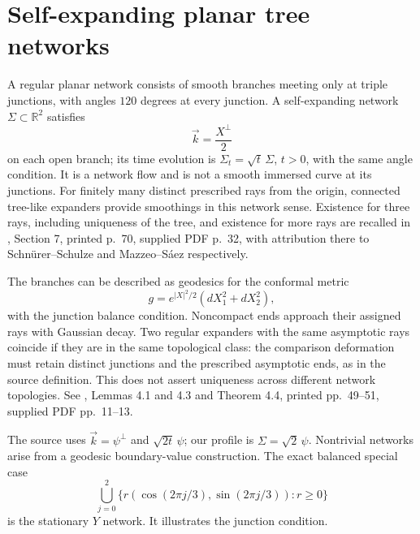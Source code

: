 \chapter{Self-expanding planar tree networks}\label{sec:catalogue-expanding-networks}
\begin{example}\label{ex:catalogue-expanding-networks}
A regular planar network consists of smooth branches meeting only at triple junctions, with angles $120$ degrees at every junction. A self-expanding network $\Sigma\subset\mathbb R^2$ satisfies
\[
 \vec k=\frac{X^\perp}{2}
\]
on each open branch; its time evolution is $\Sigma_t=\sqrt t\,\Sigma$, $t>0$, with the same angle condition. It is a network flow and is not a smooth immersed curve at its junctions. For finitely many distinct prescribed rays from the origin, connected tree-like expanders provide smoothings in this network sense. Existence for three rays, including uniqueness of the tree, and existence for more rays are recalled in \cite{CatINS19}, Section 7, printed p.~70, supplied PDF p.~32, with attribution there to Schn\"urer--Schulze and Mazzeo--S\'aez respectively.

The branches can be described as geodesics for the conformal metric
\[
 g=e^{|X|^2/2}(dX_1^2+dX_2^2),
\]
with the junction balance condition. Noncompact ends approach their assigned rays with Gaussian decay. Two regular expanders with the same asymptotic rays coincide if they are in the same topological class: the comparison deformation must retain distinct junctions and the prescribed asymptotic ends, as in the source definition. This does not assert uniqueness across different network topologies. See \cite{CatINS19}, Lemmas 4.1 and 4.3 and Theorem 4.4, printed pp.~49--51, supplied PDF pp.~11--13.

The source uses $\vec k=\psi^\perp$ and $\sqrt{2t}\,\psi$; our profile is $\Sigma=\sqrt2\,\psi$. Nontrivial networks arise from a geodesic boundary-value construction. The exact balanced special case
\[
 \bigcup_{j=0}^2\{r(\cos(2\pi j/3),\sin(2\pi j/3)):r\geq0\}
\]
is the stationary $Y$ network. It illustrates the junction condition.


\end{example}
